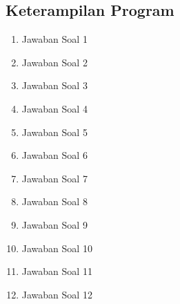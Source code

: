 \subsection{Keterampilan Program}
\begin{enumerate}
	\item Jawaban Soal 1
	
	
	\item Jawaban Soal 2
	
	
	\item Jawaban Soal 3
	
	
	\item Jawaban Soal 4
	
	
	\item Jawaban Soal 5
	
	
	\item Jawaban Soal 6
	
		
	\item Jawaban Soal 7
	
	
	\item Jawaban Soal 8
	
	
	\item Jawaban Soal 9
	
	
	\item Jawaban Soal 10
	
	
	\item Jawaban Soal 11
	
	
	\item Jawaban Soal 12
	
	
\end{enumerate}

